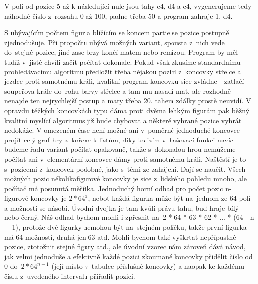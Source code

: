 \documentclass[11pt, titlepage]{article}
\begin{document}
V poli od pozice 5 až k následující nule jsou tahy e4, d4 a c4, vygenerujeme tedy náhodné číslo z~rozsahu 0 až 100, padne třeba 50 a program zahraje 1. d4.

S ubývajícím počtem figur a blížícím se koncem partie se pozice postupně zjednodušuje. Při propočtu ubývá možných variant, spousta z~nich vede do~stejné pozice, jiné zase brzy končí matem nebo remízou. Program by měl tudíž v~jisté chvíli začít počítat dokonale. Pokud však zkusíme standardnímu prohledávacímu algoritmu předložit třeba nějakou pozici z~koncovky střelce a jezdce proti samotnému králi, kvalitní program koncovku sice zvládne - zatlačí soupeřova krále do~rohu barvy střelce a tam mu nasadí mat, ale rozhodně nenajde ten nejrychlejší postup a maty třeba 20. tahem zdálky prostě neuvidí. V opravdu těžkých koncovkách typu dáma proti dvěma lehkým figurám pak běžný kvalitní myslící algoritmus již bude chybovat a některé vyhrané pozice vyhrát nedokáže. V omezeném čase není možné ani v~poměrně jednoduché koncovce projít celý graf hry z~kořene k listům, díky kolizím v~hašovací funkci navíc budeme řadu variant počítat opakovaně, takže s~dokonalou hrou nemůžeme počítat ani v~elementární koncovce dámy proti samotnému králi.
Naštěstí je to s~pozicemi z~koncovek podobné, jako s~těmi ze zahájení. Dají se naučit. Všech možných pozic několikafigurové koncovky je sice z~lidského pohledu mnoho, ale počítač má posunutá měřítka. Jednoduchý horní odhad pro počet pozic n-figurové koncovky je \begin{math}2 * 64^n\end{math}, neboť každá figurka může být na~jednom ze 64 polí a možnosti se násobí. Úvodní dvojka je tam kvůli právu tahu, buď hraje bílý nebo černý. Náš odhad bychom mohli i zpřesnit na~2 * 64 * 63 * 62 * ... * (64 - n + 1), protože dvě figurky nemohou být na~stejném políčku, takže první figurka má 64 možností, druhá jen 63 atd. Mohli bychom také vyškrtat nepřípustné pozice, ztotožnit stejné figury atd., ale úvodní vzorec nám zároveň dává návod, jak velmi jednoduše a efektivně každé pozici zkoumané koncovky přidělit číslo od 0 do~\begin{math}2 * 64^{n-1}\end{math} (její místo v~tabulce příslušné koncovky) a naopak ke každému číslu z~uvedeného intervalu přiřadit pozici.
\end{document}
